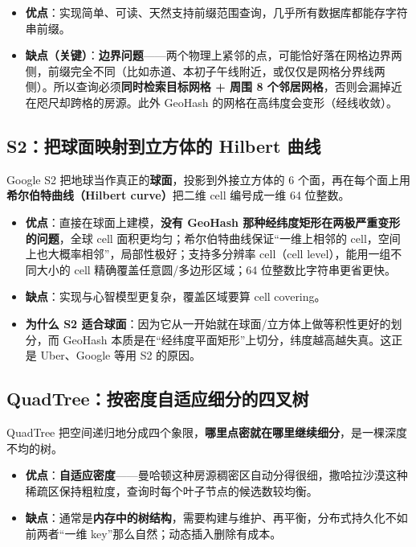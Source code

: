 \begin{itemize}
  \item \textbf{优点}：实现简单、可读、天然支持前缀范围查询，几乎所有数据库都能存字符串前缀。
  \item \textbf{缺点（关键）}：\textbf{边界问题}——两个物理上紧邻的点，可能恰好落在网格边界两侧，前缀完全不同（比如赤道、本初子午线附近，或仅仅是网格分界线两侧）。所以查询必须\textbf{同时检索目标网格 + 周围 8 个邻居网格}，否则会漏掉近在咫尺却跨格的房源。此外 GeoHash 的网格在高纬度会变形（经线收敛）。
\end{itemize}

\subsection{S2：把球面映射到立方体的 Hilbert 曲线}

Google S2 把地球当作真正的\textbf{球面}，投影到外接立方体的 6 个面，再在每个面上用\textbf{希尔伯特曲线（Hilbert curve）}把二维 cell 编号成一维 64 位整数。

\begin{itemize}
  \item \textbf{优点}：直接在球面上建模，\textbf{没有 GeoHash 那种经纬度矩形在两极严重变形的问题}，全球 cell 面积更均匀；希尔伯特曲线保证“一维上相邻的 cell，空间上也大概率相邻”，局部性极好；支持多分辨率 cell（cell level），能用一组不同大小的 cell 精确覆盖任意圆/多边形区域；64 位整数比字符串更省更快。
  \item \textbf{缺点}：实现与心智模型更复杂，覆盖区域要算 cell covering。
  \item \textbf{为什么 S2 适合球面}：因为它从一开始就在球面/立方体上做等积性更好的划分，而 GeoHash 本质是在“经纬度平面矩形”上切分，纬度越高越失真。这正是 Uber、Google 等用 S2 的原因。
\end{itemize}

\subsection{QuadTree：按密度自适应细分的四叉树}

QuadTree 把空间递归地分成四个象限，\textbf{哪里点密就在哪里继续细分}，是一棵深度不均的树。

\begin{itemize}
  \item \textbf{优点}：\textbf{自适应密度}——曼哈顿这种房源稠密区自动分得很细，撒哈拉沙漠这种稀疏区保持粗粒度，查询时每个叶子节点的候选数较均衡。
  \item \textbf{缺点}：通常是\textbf{内存中的树结构}，需要构建与维护、再平衡，分布式持久化不如前两者“一维 key”那么自然；动态插入删除有成本。
\end{itemize}

